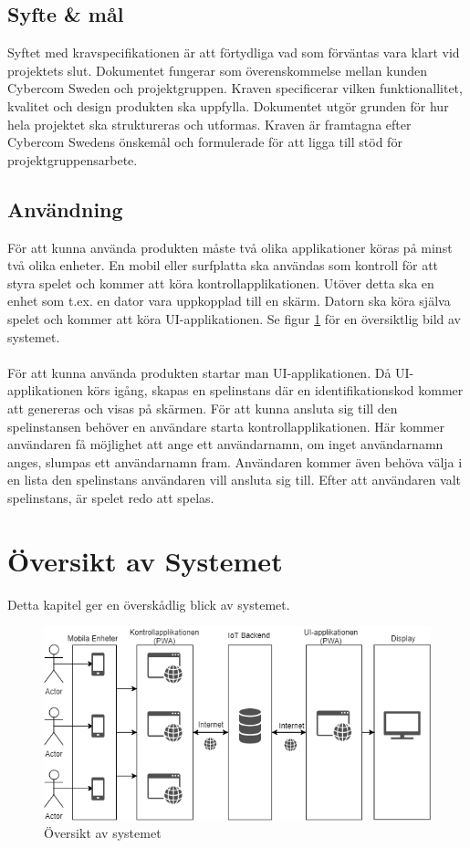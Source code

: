 \documentclass[10pt]{article}
\begin{document}
	\subsection{Syfte \& mål}
	Syftet med kravspecifikationen är att förtydliga vad som förväntas vara klart vid projektets slut. Dokumentet fungerar som överenskommelse mellan kunden Cybercom Sweden och projektgruppen. Kraven specificerar vilken funktionallitet, kvalitet och design produkten ska uppfylla. Dokumentet utgör grunden för hur hela projektet ska struktureras och utformas. Kraven är framtagna efter Cybercom Swedens önskemål och formulerade för att ligga till stöd för projektgruppensarbete.
	
	\subsection{Användning}
		För att kunna använda produkten måste två olika applikationer köras på minst två olika enheter. En mobil eller surfplatta ska användas som kontroll för att styra spelet och kommer att köra kontrollapplikationen. Utöver detta ska en enhet som t.ex. en dator vara uppkopplad till en skärm. Datorn ska köra själva spelet och kommer att köra UI-applikationen. Se figur \ref{fig:overview} för en översiktlig bild av systemet. \\
\\
För att kunna använda produkten startar man UI-applikationen. Då UI-applikationen körs igång, skapas en spelinstans där en identifikationskod kommer att genereras och visas på skärmen. För att kunna ansluta sig till den spelinstansen behöver en användare starta kontrollapplikationen. Här kommer användaren få möjlighet att ange ett användarnamn, om inget användarnamn anges, slumpas ett användarnamn fram. Användaren kommer även behöva välja i en lista den spelinstans användaren vill ansluta sig till.  Efter att användaren valt spelinstans, är spelet redo att spelas.

\pagebreak

\section{Översikt av Systemet}
	Detta kapitel ger en överskådlig blick av systemet.
	
	\begin{figure}[h]
		\centering
		\includegraphics[scale=0.8]{overview}
		\caption{Översikt av systemet}
		\label{fig:overview}
	\end{figure}
\end{document}
